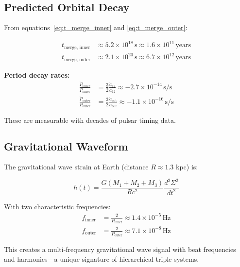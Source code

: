 \documentclass[11pt,a4paper]{article}
\theoremstyle{definition}
\theoremstyle{remark}
\begin{document}
	\subsection{Predicted Orbital Decay}
	
	From equations~\eqref{eq:t_merge_inner} and \eqref{eq:t_merge_outer}:
	
	\begin{align}
		t_{\text{merge, inner}} &\approx 5.2 \times 10^{18}\, \text{s} \approx 1.6 \times 10^{11}\, \text{years} \\
		t_{\text{merge, outer}} &\approx 2.1 \times 10^{20}\, \text{s} \approx 6.7 \times 10^{12}\, \text{years}
	\end{align}
	
	\textbf{Period decay rates:}
	\begin{align}
		\frac{\dot{P}_{\text{inner}}}{P_{\text{inner}}} &= \frac{3}{2}\frac{\dot{a}_{12}}{a_{12}} \approx -2.7 \times 10^{-14}\, \text{s/s} \label{eq:Pdot_inner_pred}\\
		\frac{\dot{P}_{\text{outer}}}{P_{\text{outer}}} &= \frac{3}{2}\frac{\dot{a}_{\text{out}}}{a_{\text{out}}} \approx -1.1 \times 10^{-16}\, \text{s/s} \label{eq:Pdot_outer_pred}
	\end{align}
	
	These are measurable with decades of pulsar timing data.
	
	\subsection{Gravitational Waveform}
	
	The gravitational wave strain at Earth (distance $R \approx 1.3$ kpc) is:
	
	\begin{equation}\label{eq:strain_formula}
		h(t) = \frac{G(M_1+M_2+M_3)}{Rc^2}\frac{d^2\Sigma^2}{dt^2}
	\end{equation}
	
	With two characteristic frequencies:
	\begin{align}
		f_{\text{inner}} &= \frac{2}{P_{\text{inner}}} \approx 1.4 \times 10^{-5}\, \text{Hz} \\
		f_{\text{outer}} &= \frac{2}{P_{\text{outer}}} \approx 7.1 \times 10^{-8}\, \text{Hz}
	\end{align}
	
	This creates a multi-frequency gravitational wave signal with beat frequencies and harmonics—a unique signature of hierarchical triple systems.
	
\end{document}
